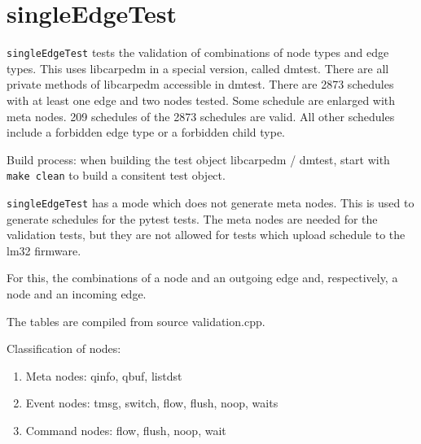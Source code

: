 \section{singleEdgeTest}
\texttt{singleEdgeTest} tests the validation of combinations of node types and edge types. This uses libcarpedm in a special version, called dmtest.
There are all private methods of libcarpedm accessible in dmtest. There are 2873 schedules
with at least one edge and two nodes tested. Some schedule are enlarged with meta nodes. 209 schedules of the 2873 schedules are valid.
All other schedules include a forbidden edge type or a forbidden child type.

Build process: when building the test object libcarpedm / dmtest, start with \texttt{make clean} to build a consitent test object.

\texttt{singleEdgeTest} has a mode which does not generate meta nodes. This is used to generate schedules for the pytest tests.
The meta nodes are needed for the validation tests, but they are not
allowed for tests which upload schedule to the lm32 firmware.

For this, the combinations of a node and an outgoing edge and,
respectively, a node and an incoming edge.

The tables are compiled from source validation.cpp.

Classification of nodes:
\begin{enumerate}
\item Meta nodes: qinfo, qbuf, listdst
\item Event nodes: tmsg, switch, flow, flush, noop, waits
\item Command nodes: flow, flush, noop, wait
\end{enumerate}

